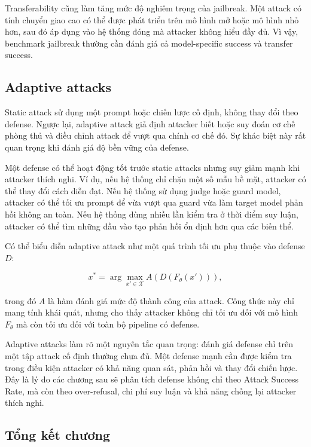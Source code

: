 Transferability cũng làm tăng mức độ nghiêm trọng của jailbreak. Một attack
có tính chuyển giao cao có thể được phát triển trên mô hình mở hoặc mô hình
nhỏ hơn, sau đó áp dụng vào hệ thống đóng mà attacker không hiểu đầy đủ.
Vì vậy, benchmark jailbreak thường cần đánh giá cả model-specific success
và transfer success.

\subsection{Adaptive attacks}
\label{subsec:adaptive-attacks}

Static attack sử dụng một prompt hoặc chiến lược cố định, không thay đổi
theo defense. Ngược lại, adaptive attack giả định attacker biết hoặc suy
đoán cơ chế phòng thủ và điều chỉnh attack để vượt qua chính cơ chế đó.
Sự khác biệt này rất quan trọng khi đánh giá độ bền vững của defense.

Một defense có thể hoạt động tốt trước static attacks nhưng suy giảm mạnh
khi attacker thích nghi. Ví dụ, nếu hệ thống chỉ chặn một số mẫu bề mặt,
attacker có thể thay đổi cách diễn đạt. Nếu hệ thống sử dụng judge hoặc
guard model, attacker có thể tối ưu prompt để vừa vượt qua guard vừa làm
target model phản hồi không an toàn. Nếu hệ thống dùng nhiều lần kiểm tra
ở thời điểm suy luận, attacker có thể tìm những đầu vào tạo phản hồi ổn
định hơn qua các biến thể.

Có thể biểu diễn adaptive attack như một quá trình tối ưu phụ thuộc vào
defense $D$:

\begin{equation}
    x^{*}
    =
    \arg\max_{x' \in \mathcal{X}}
    A
    \left(
        D(F_{\theta}(x'))
    \right),
    \label{eq:adaptive-attack-objective}
\end{equation}

trong đó $A$ là hàm đánh giá mức độ thành công của attack. Công thức này
chỉ mang tính khái quát, nhưng cho thấy attacker không chỉ tối ưu đối với
mô hình $F_{\theta}$ mà còn tối ưu đối với toàn bộ pipeline có defense.

Adaptive attacks làm rõ một nguyên tắc quan trọng: đánh giá defense chỉ
trên một tập attack cố định thường chưa đủ. Một defense mạnh cần được kiểm
tra trong điều kiện attacker có khả năng quan sát, phản hồi và thay đổi
chiến lược. Đây là lý do các chương sau sẽ phân tích defense không chỉ theo
Attack Success Rate, mà còn theo over-refusal, chi phí suy luận và khả năng
chống lại attacker thích nghi.

\subsection{Tổng kết chương}
\label{subsec:jailbreak-attacks-summary}


